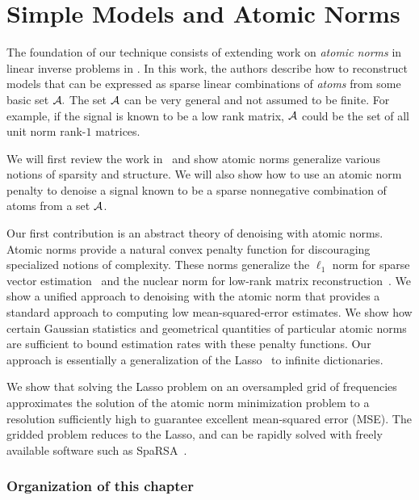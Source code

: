 \chapter{Simple Models and Atomic Norms}
\label{chap:ast}

The foundation of our technique consists of extending work on \emph{atomic
norms} in linear inverse problems in \cite{crpw}. In this work, the authors
describe how to reconstruct models that can be expressed as sparse linear
combinations of \emph{atoms} from some basic set $\mathcal{A}.$ The set $\mathcal{A}$ can be very
general and not assumed to be finite. For example, if the signal is known to be
a low rank matrix, $\mathcal{A}$ could be the set of all unit norm rank-$1$ matrices.

We will first review the work in~\cite{crpw} and show atomic norms generalize
various notions of sparsity and structure.  We will also show how to use an
atomic norm penalty to denoise a signal known to be a sparse nonnegative
combination of atoms from a set $\mathcal{A}$.

Our first contribution is an abstract theory of denoising with atomic norms.
Atomic norms provide a natural convex penalty function for discouraging
specialized notions of complexity. These norms generalize the $\ell_1$ norm
for sparse vector estimation~\cite{candes06} and the nuclear norm for low-rank
matrix reconstruction~\cite{Recht10,CandesRecht09}. We show a unified approach
to denoising with the atomic norm that provides a standard approach to
computing low mean-squared-error estimates. We show how certain Gaussian
statistics and geometrical quantities of particular atomic norms are
sufficient to bound estimation rates with these penalty functions. Our
approach is essentially a generalization of the
Lasso~\cite{tibshirani96,chen98} to infinite dictionaries.

We show that solving the Lasso problem on an oversampled grid of frequencies
approximates the solution of the atomic norm minimization problem to a
resolution sufficiently high to guarantee excellent mean-squared error (MSE).
The gridded problem reduces to the Lasso, and can be rapidly solved with freely
available software such as SpaRSA~\cite{wright09}.

\subsection{Organization of this chapter}

